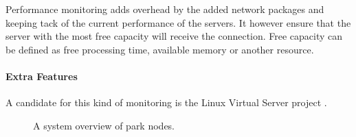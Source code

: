 Performance monitoring adds overhead by the added network packages and keeping tack of the current performance of the servers. It however ensure that the server with the most free capacity will receive the connection. Free capacity can be defined as free processing time, available memory or another resource.


\paragraph{Extra Features}

A candidate for this kind of monitoring is the Linux Virtual Server project \cite{zhang2000linuxVirtualServer}.




\begin{figure}
	\centering
	\scalebox{0.7}{}
	\caption[System overview from the load balancer viewpoint]{
		\label{fig:parkOverview} 
		\footnotesize{%
			A system overview of park nodes.
		}
	}
\end{figure}





